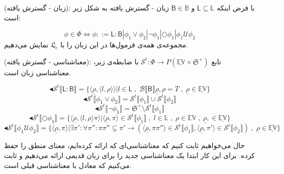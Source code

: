 \begin{defn}
	(زبان - گسترش‌ یافته): با فرض اینکه 
	$\mathsf{L} \subseteq \mathbb{L}$
	و 
	$\mathsf{B} \in \mathbb{B}$
	زبان  - گسترش یافته به شکل زیر است:
	
	$$
	\phi \in \Phi \Leftrightarrow
	\phi ::= \mathsf{L:B} | \phi_1 \lor \phi_2 |
	\neg \phi_1 |
	\bigcirc \phi_1 |
	\phi_1 \mathcal{U}\phi_2 
	$$	
	مجموعه‌ی همه‌ی فرمول‌ها در این زبان را با $\mathfrak{L}_e$ نمایش می‌دهیم.
\end{defn} 

\begin{defn}
	(معناشناسی - گسترش یافته): تابع 
	$\mathcal{S}^t : \Phi \rightarrow \mathit{P}(\mathbb{\underline{EV}}\times\mathfrak{S}^{+})$
	با ضابطه‌ی زیر، معناشناسی زبان  است.
	
	$$\blacktriangleleft \mathcal{S}^t \llbracket \mathsf{L:B} \rrbracket = 
	\{ \langle \underline{\rho} , \langle l , \rho \rangle\rangle | l \in \mathsf{L} \; , \; \mathcal{B}\llbracket \mathsf{B} \rrbracket \underline{\rho}, \rho=\mathit{T} \; , \; \underline{\rho}\in \mathbb{\underline{EV}}\}$$
	$$\blacktriangleleft \mathcal{S}^t \llbracket \mathsf{\phi_1 \lor \phi_2} \rrbracket =
	\mathcal{S}^t \llbracket \phi_1 \rrbracket \cup \mathcal{S}^t \llbracket \phi_2 \rrbracket
	$$
	$$\blacktriangleleft \mathcal{S}^t \llbracket \mathsf{\neg \phi_1} \rrbracket =
	\mathfrak{S}^{+} \setminus \mathcal{S}^t \llbracket \phi_1 \rrbracket
	$$
	$$\blacktriangleleft \mathcal{S}^t \llbracket \mathsf{\bigcirc \phi_1} \rrbracket =
	\{ \langle \underline{\rho} , \langle l , \rho \rangle \pi \rangle | \langle \underline{\rho},\pi \rangle \in \mathcal{S}^t \llbracket \phi_1 \rrbracket \; , \; l \in \mathbb{L} \; , \; \rho \in \mathbb{EV} \; , \;\underline{\rho},\in \mathbb{\underline{EV}} \}
	$$
	$$\blacktriangleleft \mathcal{S}^t \llbracket \mathsf{\phi_1 \mathcal{U} \phi_2} \rrbracket =
	\{ \langle \underline{\rho} , \pi \rangle | \exists \pi': \forall \pi'': \pi \pi'' \subsetneq \pi' \rightarrow (\langle \underline{\rho}, \pi \pi'' \rangle \in \mathcal{S}^t \llbracket \phi_1 \rrbracket,\langle \underline{\rho}, \pi' \rangle \in \mathcal{S}^t \llbracket \phi_2 \rrbracket) \; , \;\underline{\rho} \in \mathbb{\underline{EV}} \}
	$$
	
	
\end{defn}

حال می‌خواهیم ثابت کنیم که معناشناسی‌ای که ارائه کرده‌ایم، معنای منطق  را حفظ کرده. 
برای این کار ابتدا یک معناشناسی جدید را برای زبان  قدیمی ارائه می‌دهیم و ثابت می‌کنیم که معادل با معناشناسی قبلی است. 

